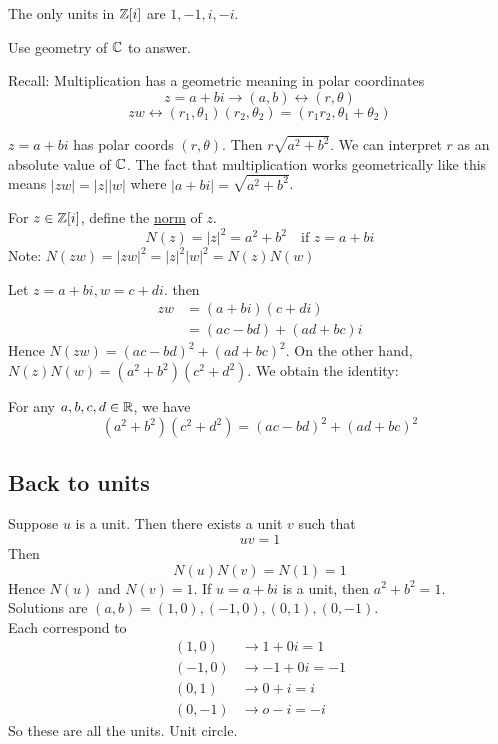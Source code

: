     \begin{theorem}
        The only units in $\mathbb{Z}[i]$ are $1,-1,i,-i$.
    \end{theorem}

    Use geometry of $\mathbb{C}$ to answer.

    Recall: Multiplication has a geometric meaning in polar coordinates
    \[
        z=a+bi \rightarrow (a,b) \leftrightarrow (r,\theta)
    \]
    \[
        zw \leftrightarrow (r_1, \theta_1)(r_2, \theta_2) = (r_1r_2, \theta_1 + \theta_2)
    \]

    $z=a+bi$ has polar coords $(r,\theta)$. Then $r\sqrt{a^2+b^2}$.
    We can interpret $r$ as an absolute value of $\mathbb{C}$. 
    The fact that multiplication works geometrically like this means $|zw| = |z||w|$
    where $|a+bi| = \sqrt{a^2+b^2}$.

    \begin{definition}
        For $z\in\mathbb{Z}[i]$, define the \underline{norm} of $z$. 
        \[
            N(z) = |z|^2 = a^2 + b^2 \quad\text{if } z=a+bi
        \]
        Note: $N(zw) = |zw|^2=|z|^2|w|^2=N(z)N(w)$
    \end{definition}

    Let $z=a+bi, w = c+di$. then
    \begin{align*}
        zw &= (a+bi)(c+di) \\
        &= (ac-bd) + (ad+bc)i
    \end{align*}
    Hence $N(zw) = (ac-bd)^2 + (ad+bc)^2$. 
    On the other hand, $N(z)N(w) = (a^2+b^2)(c^2+d^2)$.
    We obtain the identity:
    \begin{theorem}
        For any $a,b,c,d\in\mathbb{R}$, we have
        \[
            (a^2+b^2)(c^2+d^2) = (ac-bd)^2 + (ad+bc)^2
        \]
    \end{theorem}

    \subsection{Back to units}
    Suppose $u$ is a unit. Then there exists a unit $v$ such that 
    \[
        uv=1
    \]
    Then 
    \[
        N(u)N(v) = N(1) = 1
    \]
    Hence $N(u)$ and $N(v) = 1$. 
    If $u=a+bi$ is a unit, then $a^2+b^2 = 1$. \\
    Solutions are $(a,b) = (1,0), (-1,0), (0,1), (0,-1)$. \\
    Each correspond to 
    \begin{align*}
        (1,0) &\rightarrow 1 + 0i = 1 \\
        (-1,0) &\rightarrow -1 + 0i = -1 \\
        (0,1) &\rightarrow 0 + i = i \\
        (0,-1) &\rightarrow o - i = -i
    \end{align*}
    So these are all the units. Unit circle.

